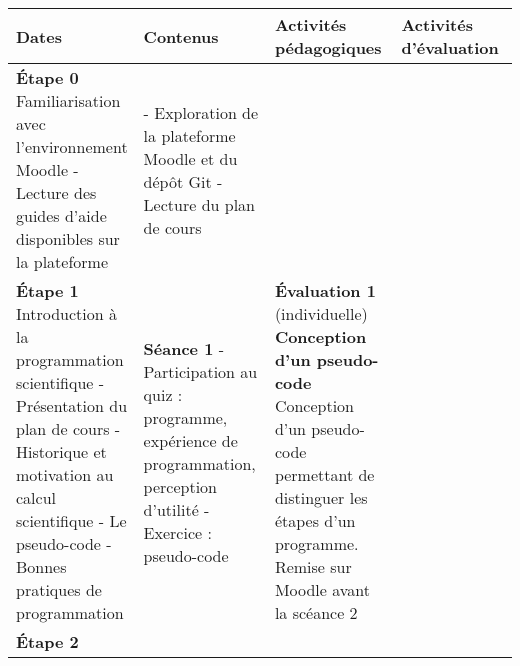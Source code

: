 \documentclass[12]{article}
\begin{document}
	\begin{center}
        \begin{tabular}{| p{0.1\linewidth} | p{0.3\linewidth} | p{0.3\linewidth} | p{0.3\linewidth} | } 
        \hline
        Dates & Contenus & Activités pédagogiques & Activités d'évaluation \\ [0.5ex] 
        \hline\hline
        \textbf{Étape 0}
        Familiarisation avec l'environnement Moodle\hfill\hfill \linebreak\linebreak 
        	- Lecture des guides d’aide disponibles sur la plateforme\hfill\hfill &
        - Exploration de la plateforme Moodle et du dépôt Git\hfill\hfill \linebreak
        - Lecture du plan de cours\hfill\hfill \linebreak
         \\
         \hline
         \textbf{Étape 1}
        Introduction à la programmation scientifique\hfill\hfill \linebreak\linebreak
            - Présentation du plan de cours\hfill \linebreak
			- Historique et motivation au calcul scientifique\hfill\hfill \linebreak
        	- Le pseudo-code\hfill\hfill \linebreak
    		- Bonnes pratiques de programmation\hfill\hfill & 
        \textbf{Séance 1} \linebreak
        - Participation au quiz : programme, expérience de programmation, perception d'utilité\hfill\hfill\hfill \linebreak
        - Exercice : pseudo-code\hfill\hfill\hfill \linebreak & 
        \textbf{Évaluation 1} (individuelle) \linebreak
        \textbf{Conception d'un pseudo-code}\hfill\hfill \linebreak
        Conception d'un pseudo-code permettant de distinguer les étapes d'un programme. Remise sur Moodle avant la scéance 2\hfill\hfill \\
        \hline
        \textbf{Étape 2}

\end{tabular}
\end{center}
\end{document}
